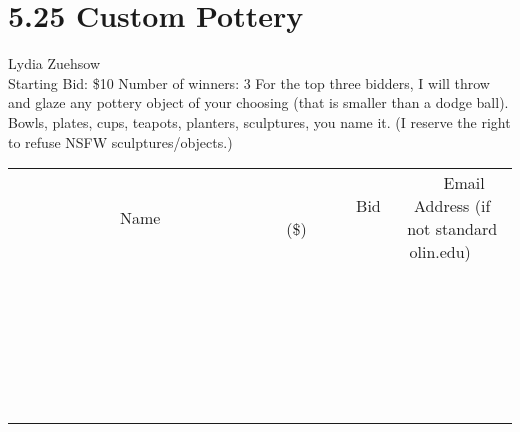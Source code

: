 \documentclass[11pt]{article}
\begin{document}
\section*{5.25 Custom Pottery}
Lydia Zuehsow
\\
Starting Bid: \$10
\newline
Number of winners: 3
\newline
For the top three bidders, I will throw and glaze any pottery object of your choosing (that is smaller than a dodge ball). Bowls, plates, cups, teapots, planters, sculptures, you name it.
(I reserve the right to refuse NSFW sculptures/objects.)
\\[6ex]
\begin{tabular}{c c c}
~~~~~~~~~~~~~Name~~~~~~~~~~~~~ & ~~~~~~~~~Bid (\$)~~~~~~~~~  & ~~~Email Address (if not standard olin.edu)~~~\\
 & & \\
\hline
 & & \\
\hline
 & & \\
\hline
 & & \\
\hline
 & & \\
\hline
 & & \\
\hline
 & & \\
\hline
 & & \\
\hline
 & & \\
\hline
 & & \\
\hline
 & & \\
\hline
 & & \\
\hline
 & & \\
\hline
 & & \\
\hline
 & & \\
\hline
 & & \\
\hline
 & & \\
\hline
 & & \\
\hline
 & & \\
\hline
 & & \\
\hline
 & & \\
\hline
 & & \\
\hline
 & & \\
\hline
 & & \\
\hline
 & & \\
\hline
 & & \\
\hline
\end{tabular}
\newpage
\end{document}
